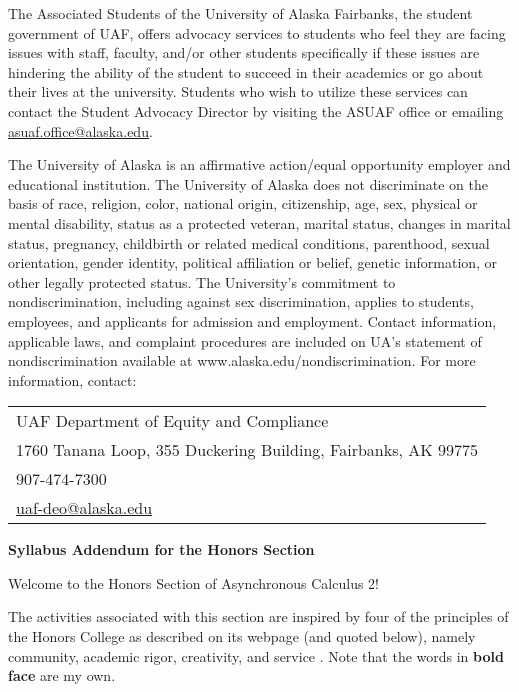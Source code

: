 \documentclass[12pt]{article}
\def\mailto#1{\href{mailto:#1}{#1}}
\begin{document}
The Associated Students of the University of Alaska Fairbanks, the student government of UAF, offers advocacy services to students who feel they are facing issues with staff, faculty, and/or other students specifically if these issues are hindering the ability of the student to succeed in their academics or go about their lives at the university. Students who wish to utilize these services can contact the Student Advocacy Director by visiting the ASUAF office or emailing \mailto{asuaf.office@alaska.edu}.

The University of Alaska is an affirmative action/equal opportunity employer and educational institution. The University of Alaska does not discriminate on the basis of race, religion, color, national origin, citizenship, age, sex, physical or mental disability, status as a protected veteran, marital status, changes in marital status, pregnancy, childbirth or related medical conditions, parenthood, sexual orientation, gender identity, political affiliation or belief, genetic information, or other legally protected status. The University's commitment to nondiscrimination, including against sex discrimination, applies to students, employees, and applicants for admission and employment. Contact information, applicable laws, and complaint procedures are included on UA's statement of nondiscrimination available at www.alaska.edu/nondiscrimination. For more information, contact:

\begin{tabular}{l}
UAF Department of Equity and Compliance\\
1760 Tanana Loop, 355 Duckering Building, Fairbanks, AK  99775\\
907-474-7300\\
\mailto{uaf-deo@alaska.edu}
\end{tabular}

\newpage
\begin{center}
\textbf{\large{Syllabus Addendum for the Honors Section}}
\end{center}

Welcome to the Honors Section of Asynchronous Calculus 2!

The activities associated with this section are inspired by four of the principles of the Honors College as described on its webpage (and quoted below), namely community, academic rigor, creativity, and service . Note that the words in \textbf{bold face} are my own.
\end{document}
